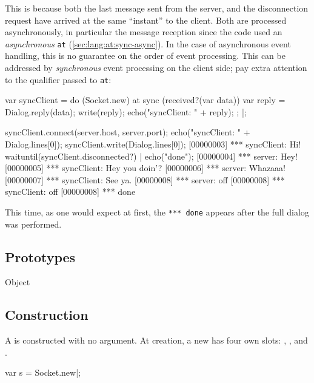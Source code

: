 This is because both the last message sent from the server, and the
disconnection request have arrived at the same ``instant'' to the client.
Both are processed asynchronously, in particular the message reception since
the code used an \emph{asynchronous} \lstinline{at}
(\autoref{sec:lang:at:sync-async}).  In the case of asynchronous event
handling, this is no guarantee on the order of event processing.  This can
be addressed by \emph{synchronous} event processing on the client side; pay
extra attention to the  qualifier passed to \lstinline{at}:

\begin{urbiscript}
var syncClient =
  do (Socket.new)
  {
    at sync (received?(var data))
    {
      var reply = Dialog.reply(data);
      write(reply);
      echo("syncClient: " + reply);
    };
  }|;

syncClient.connect(server.host, server.port);
echo("syncClient: " + Dialog.lines[0]);
syncClient.write(Dialog.lines[0]);
[00000003] *** syncClient: Hi!
waituntil(syncClient.disconnected?) | echo("done");
[00000004] *** server: Hey!
[00000005] *** syncClient: Hey you doin'?
[00000006] *** server: Whazaaa!
[00000007] *** syncClient: See ya.
[00000008] *** server: off
[00000008] *** syncClient: off
[00000008] *** done
\end{urbiscript}

\noindent
This time, as one would expect at first, the \lstinline{*** done} appears
after the full dialog was performed.


\subsection{Prototypes}
\begin{refObjects}
\item[Object]
\end{refObjects}

\subsection{Construction}

A  is constructed with no argument. At creation, a
new  has four own slots: ,
,  and .

\begin{urbiscript}
var s = Socket.new|;
\end{urbiscript}

